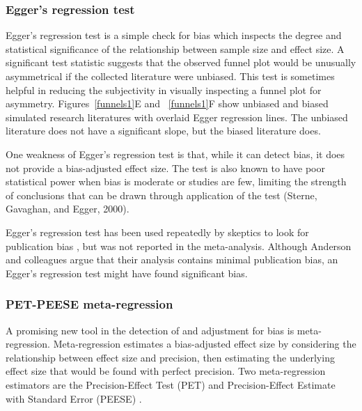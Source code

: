 \documentclass[man]{apa6}
\begin{document}
\subsubsection{Egger's regression test}
Egger's regression test \citep{Egger:1997} is a simple check for bias which inspects the degree and statistical significance of the relationship between sample size and effect size. A significant test statistic suggests that the observed funnel plot would be unusually asymmetrical if the collected literature were unbiased. This test is sometimes helpful in reducing the subjectivity in visually inspecting a funnel plot for asymmetry. Figures~\ref{funnels1}E and ~\ref{funnels1}F show unbiased and biased simulated research literatures with overlaid Egger regression lines. The unbiased literature does not have a significant slope, but the biased literature does. 

One weakness of Egger's regression test is that, while it can detect bias, it does not provide a bias-adjusted effect size. The test is also known to have poor statistical power when bias is moderate or studies are few, limiting the strength of conclusions that can be drawn through application of the test (Sterne, Gavaghan, and Egger, 2000).

Egger's regression test has been used repeatedly by skeptics to look for publication bias \citep[e.g.,][]{Ferguson:2007,Ferguson:Kilburn:2009}, but was not reported in the \citet{Anderson:etal:2010} meta-analysis. Although Anderson and colleagues argue that their analysis contains minimal publication bias, an Egger's regression test might have found significant bias.

\subsubsection{PET-PEESE meta-regression}
A promising new tool in the detection of and adjustment for bias is meta-regression. Meta-regression estimates a bias-adjusted effect size by considering the relationship between effect size and precision, then estimating the underlying effect size that would be found with perfect precision. Two meta-regression estimators are the Precision-Effect Test (PET) and Precision-Effect Estimate with Standard Error (PEESE) \citep{Stanley:Doucouliagos:2014}. %
\end{document}
